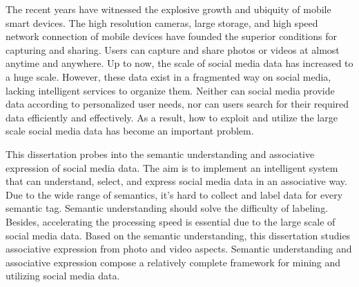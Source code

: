 \documentclass[doctor]{ustcthesis}
\begin{document}
\begin{enabstract}
    The recent years have witnessed the explosive growth and ubiquity of mobile
    smart devices. The high resolution cameras, large storage, and high speed
    network connection of mobile devices have founded the superior conditions
    for capturing and sharing. Users can capture and share photos or videos at
    almost anytime and anywhere.  Up to now, the scale of social media data has
    increased to a huge scale.  However, these data exist in a fragmented way on
    social media, lacking intelligent services to organize them. Neither can
    social media provide data according to personalized user needs, nor can
    users search for their required data efficiently and effectively. As a
    result, how to exploit and utilize the large scale social media data has
    become an important problem.

    This dissertation probes into the semantic understanding and associative
    expression of social media data. The aim is to implement an intelligent
    system that can understand, select, and express social media data in an
    associative way. Due to the wide range of semantics, it's hard to collect
    and label data for every semantic tag. Semantic understanding should solve
    the difficulty of labeling. Besides, accelerating the processing speed  is
    essential due to the large scale of social media data.  Based on the
    semantic understanding, this dissertation studies associative expression
    from photo and video aspects.  Semantic understanding and associative
    expression compose a relatively complete framework for mining and utilizing
    social media data.


\end{enabstract}
\end{document}
